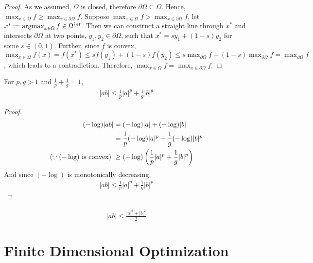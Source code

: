 \documentclass{article}
\begin{document}
    \begin{proof}
        As we assumed, $\Omega$ is closed, therefore $\partial \Omega \subseteq \Omega$. Hence, $\max_{x \in \Omega} f \geq \max_{x \in \partial \Omega} f$. Suppose $\max_{x \in \Omega} f > \max_{x \in \partial \Omega} f$, let $x^* := \operatorname*{argmax}_{x \in \Omega} f \in \Omega^{int}$. Then we can construct a straight line through $x^*$ and intersects $\partial \Omega$ at two points, $y_1, y_2 \in \partial \Omega$, such that $x^* = s y_1 + (1-s) y_2$ for some $s \in (0, 1)$. Further, since $f$ is convex, $\max_{x \in \Omega}f(x) = f(x^*) \leq s f(y_1) + (1-s) f(y_2) \leq s \max_{\partial \Omega} f + (1-s) \max_{\partial \Omega} f = \max_{\partial \Omega} f$, which leads to a contradiction. Therefore, $\max_{x \in \Omega} f = \max_{x \in \partial \Omega} f$.
    \end{proof}
    
    \begin{proposition}
    	For $p, g > 1$ and $\frac{1}{p} + \frac{1}{g} = 1$,
    	\begin{align}
    		|ab| \leq \frac{1}{p} |a|^p + \frac{1}{g}|b|^g
    	\end{align}
    \end{proposition}
    
    \begin{proof}
    	\begin{align}
    		(-\log) |ab| &= (-\log) |a| + (-\log) |b| \\
    		&= \frac{1}{p} (-\log) |a|^p + \frac{1}{g} (-\log) |b|^p \\
    		(\because (-\log) \text{{ is convex}})\ &\geq (-\log)\left( \frac{1}{p} |a|^p + \frac{1}{g} |b|^p \right)
    	\end{align}
    	And since $(-\log)$ is monotonically decreasing,
    	\begin{align}
    		|ab| \leq \frac{1}{p} |a|^p + \frac{1}{g} |b|^p
    	\end{align}
    \end{proof}
    
    \begin{corollary}
    	\begin{align}
    		|ab| \leq \frac{|a|^2 + |b|^2}{2}
    	\end{align}
    \end{corollary}
	
	\section{Finite Dimensional Optimization}
\end{document}

